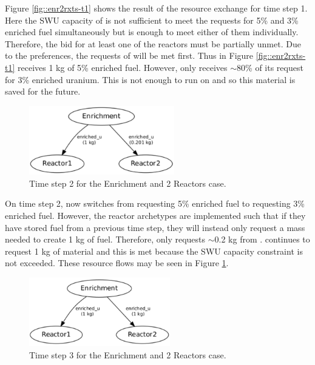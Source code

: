 Figure \ref{fig::enr2rxts-t1} shows the result of the resource exchange for time
step 1.  Here the SWU capacity of \Enrichment{} is not sufficient to meet the
requests for 5\% and 3\% enriched fuel simultaneously but is enough to meet
either of them individually.  Therefore, the bid for at least one of the
reactors must be partially unmet.  Due to the preferences, the requests
of  will be met first.  Thus in
Figure \ref{fig::enr2rxts-t1}  receives 1 kg of 5\% enriched fuel.
However,  only receives $\sim$80\% of its request for 3\% enriched
uranium.  This is not enough to run on and so this material is saved for the
future.

\begin{figure}[ht!]
  \begin{center}
    \includegraphics[height=3cm]{./figs/1_Enrichment_2_Reactor-t2.pdf}
    \caption[]{\label{fig::enr2rxts-t2}Time step 2 for the Enrichment and 2 Reactors 
        case.}
  \end{center}
\end{figure}

On time step 2,  now switches from requesting 5\% enriched fuel to
requesting 3\% enriched fuel.  However, the reactor archetypes are implemented
such that if they have stored fuel from a previous time step, they will instead
only request a mass needed to create 1 kg of fuel.  Therefore,  only
requests $\sim$0.2 kg from \Enrichment{}.   continues to request 1 kg
of material and this is met because the SWU capacity constraint is not exceeded.
These resource flows may be seen in Figure \ref{fig::enr2rxts-t2}.

\begin{figure}[ht!]
  \begin{center}
    \includegraphics[height=3cm]{./figs/1_Enrichment_2_Reactor-t3.pdf}
    \caption[]{\label{fig::enr2rxts-t3}Time step 3 for the Enrichment and 2 Reactors 
        case.}
  \end{center}
\end{figure}

